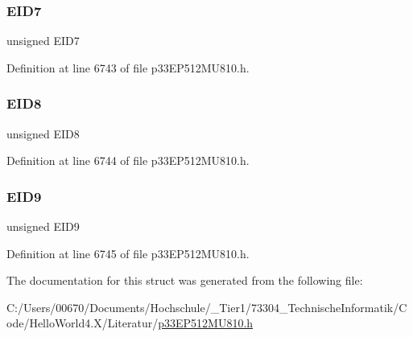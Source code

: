 \subsubsection{\texorpdfstring{E\+I\+D7}{EID7}}
{\footnotesize\ttfamily unsigned E\+I\+D7}



Definition at line 6743 of file p33\+E\+P512\+M\+U810.\+h.

\mbox{\label{structtag_c2_r_x_f9_e_i_d_b_i_t_s_acca25e0b7d86eb499d01f85222baea87}} 
\subsubsection{\texorpdfstring{E\+I\+D8}{EID8}}
{\footnotesize\ttfamily unsigned E\+I\+D8}



Definition at line 6744 of file p33\+E\+P512\+M\+U810.\+h.

\mbox{\label{structtag_c2_r_x_f9_e_i_d_b_i_t_s_ac6748f73d4ada8538b06548be4f396c2}} 
\subsubsection{\texorpdfstring{E\+I\+D9}{EID9}}
{\footnotesize\ttfamily unsigned E\+I\+D9}



Definition at line 6745 of file p33\+E\+P512\+M\+U810.\+h.



The documentation for this struct was generated from the following file\+:\begin{DoxyCompactItemize}
\item 
C\+:/\+Users/00670/\+Documents/\+Hochschule/\+\_\+\+Tier1/73304\+\_\+\+Technische\+Informatik/\+Code/\+Hello\+World4.\+X/\+Literatur/\hyperlink{p33_e_p512_m_u810_8h}{p33\+E\+P512\+M\+U810.\+h}\end{DoxyCompactItemize}
